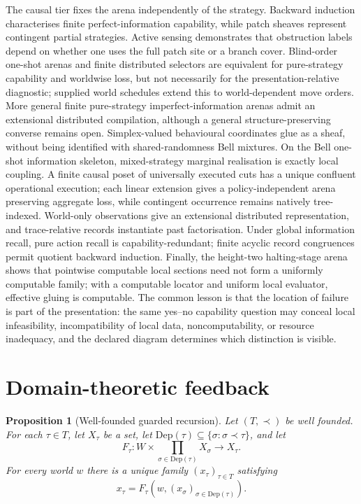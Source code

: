 \documentclass[11pt]{article}
\theoremstyle{plain}
\newtheorem{proposition}[theorem]{Proposition}
\theoremstyle{definition}
\theoremstyle{remark}
\begin{document}
The causal tier fixes the arena independently of the strategy. Backward
induction characterises finite perfect-information capability, while patch
sheaves represent contingent partial strategies. Active sensing demonstrates
that obstruction labels depend on whether one uses the full patch site or a
branch cover. Blind-order one-shot arenas and finite distributed selectors are
equivalent for pure-strategy capability and worldwise loss, but not necessarily
for the presentation-relative diagnostic; supplied world schedules extend this to
world-dependent move orders. More general finite pure-strategy
imperfect-information arenas admit an extensional distributed compilation,
although a general structure-preserving converse remains open. Simplex-valued
behavioural coordinates glue as a sheaf, without being identified with
shared-randomness Bell mixtures. On the Bell one-shot information skeleton,
mixed-strategy marginal realisation is exactly local coupling. A finite causal
poset of universally executed cuts has a unique confluent operational execution;
each linear extension gives a policy-independent arena preserving aggregate
loss, while contingent occurrence remains natively tree-indexed. World-only
observations give an extensional distributed representation, and trace-relative
records instantiate past factorisation. Under global information recall, pure action recall is capability-redundant;
finite acyclic record congruences permit quotient backward induction. Finally, the height-two halting-stage arena shows that
pointwise computable local sections need not form a uniformly computable family;
with a computable locator and uniform local evaluator, effective gluing is
computable. The common lesson is that the location of failure is part of the
presentation: the same yes--no capability question may conceal local
infeasibility, incompatibility of local data, noncomputability, or resource
inadequacy, and the declared diagram determines which distinction is visible.

\appendix
\section{Domain-theoretic feedback}\label{sec:domain-feedback}

\begin{proposition}[Well-founded guarded recursion]\label{prop:guarded-recursion}
Let $(T,\prec)$ be well founded. For each $\tau\in T$, let $X_\tau$ be a set,
let $\mathrm{Dep}(\tau)\subseteq\{\sigma:\sigma\prec\tau\}$, and let
\[
F_\tau:W\times\prod_{\sigma\in\mathrm{Dep}(\tau)}X_\sigma\to X_\tau.
\]
For every world $w$ there is a unique family $(x_\tau)_{\tau\in T}$ satisfying
\[
x_\tau=F_\tau(w,(x_\sigma)_{\sigma\in\mathrm{Dep}(\tau)}).
\]
\end{proposition}
\end{document}

